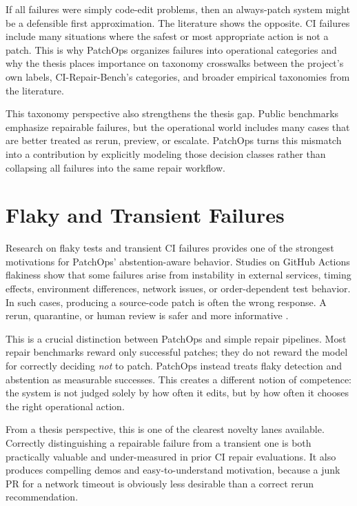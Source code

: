 If all failures were simply code-edit problems, then an always-patch system might be a defensible first
approximation. The literature shows the opposite. CI failures include many situations where the safest or most
appropriate action is not a patch. This is why PatchOps organizes failures into operational categories and why
the thesis places importance on taxonomy crosswalks between the project's own labels, CI-Repair-Bench's
categories, and broader empirical taxonomies from the literature.

This taxonomy perspective also strengthens the thesis gap. Public benchmarks emphasize repairable failures, but
the operational world includes many cases that are better treated as rerun, preview, or escalate. PatchOps
turns this mismatch into a contribution by explicitly modeling those decision classes rather than collapsing all
failures into the same repair workflow.

\section{Flaky and Transient Failures}

Research on flaky tests and transient CI failures provides one of the strongest motivations for PatchOps'
abstention-aware behavior. Studies on GitHub Actions flakiness show that some failures arise from instability in
external services, timing effects, environment differences, network issues, or order-dependent test behavior.
In such cases, producing a source-code patch is often the wrong response. A rerun, quarantine, or human review
is safer and more informative \cite{ghaflaky2026}.

This is a crucial distinction between PatchOps and simple repair pipelines. Most repair benchmarks reward only
successful patches; they do not reward the model for correctly deciding \emph{not} to patch. PatchOps instead
treats flaky detection and abstention as measurable successes. This creates a different notion of competence:
the system is not judged solely by how often it edits, but by how often it chooses the right operational action.

From a thesis perspective, this is one of the clearest novelty lanes available. Correctly distinguishing a
repairable failure from a transient one is both practically valuable and under-measured in prior CI repair
evaluations. It also produces compelling demos and easy-to-understand motivation, because a junk PR for a
network timeout is obviously less desirable than a correct rerun recommendation.

